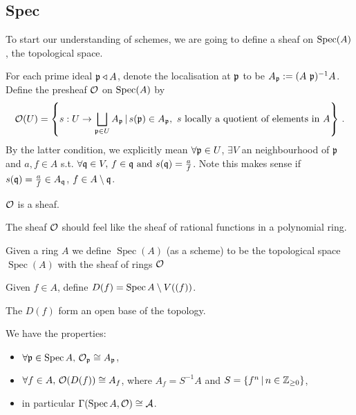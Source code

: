 \documentclass{article}
\begin{document}
\subsection{Spec}

To start our understanding of schemes, we are going to define a sheaf on $\operatorname{Spec}(A)$, the topological space. 
\begin{definition}
	For each prime ideal $\mathfrak{p} \triangleleft A$, denote the localisation at $\mathfrak{p}$ to be $A_{\mathfrak{p}} := (A\ \mathfrak{p})^{-1}A$. Define the presheaf $\mathcal{O}$ on $\operatorname{Spec}(A)$ by 
	\[
	\mathcal{O}(U) = \left\{ s : U \to \bigsqcup_{\mathfrak{p} \in U} A_{\mathfrak{p}} \, | \, s(\mathfrak{p}) \in A_{\mathfrak{p}} ,\text{ $s$ locally a quotient of elements in $A$} \right\} \, .
	\]
	By the latter condition, we explicitly mean $\forall \mathfrak{p} \in U$, $\exists V$ an neighbourhood of $\mathfrak{p}$ and $a,f \in A$ s.t. $\forall \mathfrak{q} \in V, \, f \in \mathfrak{q} \text{ and } s(\mathfrak{q}) = \frac{a}{f}$. Note this makes sense if $s(\mathfrak{q}) = \frac{a}{f} \in A_{\mathfrak{q}}$, $f \in A \setminus \mathfrak{q}$.   
\end{definition}
\begin{lemma}
	$\mathcal{O}$ is a sheaf. 
\end{lemma}

\begin{remark}
	The sheaf $\mathcal{O}$ should feel like the sheaf of rational functions in a polynomial ring. 
\end{remark}

\begin{definition}
 Given a ring $A$ we define $\operatorname{Spec}(A)$ (as a scheme) to be the topological space $\operatorname{Spec}(A)$ with the sheaf of rings $\mathcal{O}$ 
\end{definition}

\begin{definition}
	Given $f \in A$, define $D(f) = \operatorname{Spec} A \setminus V((f))$. 
\end{definition}

\begin{lemma}
	The $D(f)$ form an open base of the topology. 
\end{lemma}

\begin{prop}
	We have the properties:
	\begin{itemize}
		\item $\forall \mathfrak{p} \in \operatorname{Spec} A, \, \mathcal{O}_{\mathfrak{p}} \cong A_{\mathfrak{p}}$, \
		\item $\forall f \in A, \, \mathcal{O}(D(f)) \cong A_f$, where $A_f = S^{-1}A$ and $S = \left\{ f^n \, | \, n \in \mathbb{Z}_{\geq 0} \right\}$,
		\item in particular $\Gamma(\operatorname{Spec} A, \mathcal{O}) \cong \mathcal{A}$.   
	\end{itemize}
\end{prop}
\end{document}
